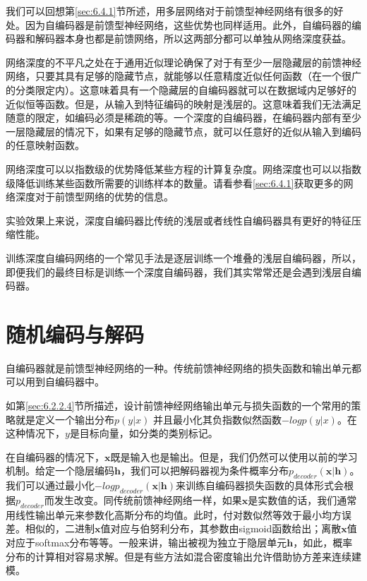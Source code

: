 我们可以回想第\ref{sec:6.4.1}节所述，用多层网络对于前馈型神经网络有很多的好处。因为自编码器是前馈型神经网络，这些优势也同样适用。此外，自编码器的编码器和解码器本身也都是前馈网络，所以这两部分都可以单独从网络深度获益。

网络深度的不平凡之处在于通用近似理论确保了对于有至少一层隐藏层的前馈神经网络，只要其具有足够的隐藏节点，就能够以任意精度近似任何函数（在一个很广的分类限定内）。这意味着具有一个隐藏层的自编码器就可以在数据域内足够好的近似恒等函数。但是，从输入到特征编码的映射是浅层的。这意味着我们无法满足随意的限定，如编码必须是稀疏的等。一个深度的自编码器，在编码器内部有至少一层隐藏层的情况下，如果有足够的隐藏节点，就可以任意好的近似从输入到编码的任意映射函数。

网络深度可以以指数级的优势降低某些方程的计算复杂度。网络深度也可以以指数级降低训练某些函数所需要的训练样本的数量。请看参看\ref{sec:6.4.1}获取更多的网络深度对于前馈型网络的优势的信息。

实验效果上来说，深度自编码器比传统的浅层或者线性自编码器具有更好的特征压缩性能。

训练深度自编码网络的一个常见手法是逐层训练一个堆叠的浅层自编码器，所以，即便我们的最终目标是训练一个深度自编码器，我们其实常常还是会遇到浅层自编码器。

\section{随机编码与解码}
\label{sec:14.4}
自编码器就是前馈型神经网络的一种。传统前馈神经网络的损失函数和输出单元都可以用到自编码器中。

如第\ref{sec:6.2.2.4}节所描述，设计前馈神经网络输出单元与损失函数的一个常用的策略就是定义一个输出分布$p(y| x)$ 并且最小化其负指数似然函数$-log p(y|x)$。在这种情况下，$y$是目标向量，如分类的类别标记。

在自编码器的情况下，$\bm{x}$既是输入也是输出。但是，我们仍然可以使用以前的学习机制。给定一个隐层编码$\bm{h}$，我们可以把解码器视为条件概率分布$p_{decoder}(\bm{x}|\bm{h})$。我们可以通过最小化$-log p_{decoder}(\bm{x}|\bm{h})$来训练自编码器损失函数的具体形式会根据$p_{decoder}$而发生改变。同传统前馈神经网络一样，如果$\bm{x}$是实数值的话，我们通常用线性输出单元来参数化高斯分布的均值。此时，付对数似然等效于最小均方误差。相似的，二进制$\bm{x}$值对应与伯努利分布，其参数由sigmoid函数给出；离散$\bm{x}$值对应于softmax分布等等。一般来讲，输出被视为独立于隐层单元$\bm{h}$，如此，概率分布的计算相对容易求解。但是有些方法如混合密度输出允许借助协方差来连续建模。

